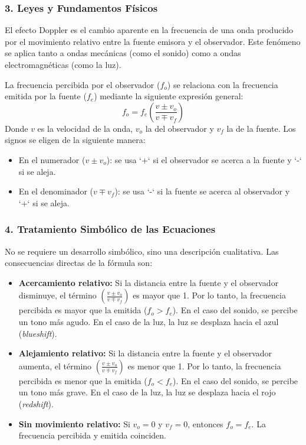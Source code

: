 \subsubsection*{3. Leyes y Fundamentos Físicos}
El efecto Doppler es el cambio aparente en la frecuencia de una onda producido por el movimiento relativo entre la fuente emisora y el observador. Este fenómeno se aplica tanto a ondas mecánicas (como el sonido) como a ondas electromagnéticas (como la luz).

La frecuencia percibida por el observador ($f_o$) se relaciona con la frecuencia emitida por la fuente ($f_e$) mediante la siguiente expresión general:
$$f_o = f_e \left( \frac{v \pm v_o}{v \mp v_f} \right)$$
Donde $v$ es la velocidad de la onda, $v_o$ la del observador y $v_f$ la de la fuente. Los signos se eligen de la siguiente manera:
\begin{itemize}
    \item En el numerador ($v \pm v_o$): se usa `+` si el observador se acerca a la fuente y `-` si se aleja.
    \item En el denominador ($v \mp v_f$): se usa `-` si la fuente se acerca al observador y `+` si se aleja.
\end{itemize}

\subsubsection*{4. Tratamiento Simbólico de las Ecuaciones}
No se requiere un desarrollo simbólico, sino una descripción cualitativa. Las consecuencias directas de la fórmula son:
\begin{itemize}
    \item \textbf{Acercamiento relativo:} Si la distancia entre la fuente y el observador disminuye, el término $\left( \frac{v \pm v_o}{v \mp v_f} \right)$ es mayor que 1. Por lo tanto, la frecuencia percibida es mayor que la emitida ($f_o > f_e$). En el caso del sonido, se percibe un tono más agudo. En el caso de la luz, la luz se desplaza hacia el azul (\textit{blueshift}).
    \item \textbf{Alejamiento relativo:} Si la distancia entre la fuente y el observador aumenta, el término $\left( \frac{v \pm v_o}{v \mp v_f} \right)$ es menor que 1. Por lo tanto, la frecuencia percibida es menor que la emitida ($f_o < f_e$). En el caso del sonido, se percibe un tono más grave. En el caso de la luz, la luz se desplaza hacia el rojo (\textit{redshift}).
    \item \textbf{Sin movimiento relativo:} Si $v_o=0$ y $v_f=0$, entonces $f_o = f_e$. La frecuencia percibida y emitida coinciden.
\end{itemize}

